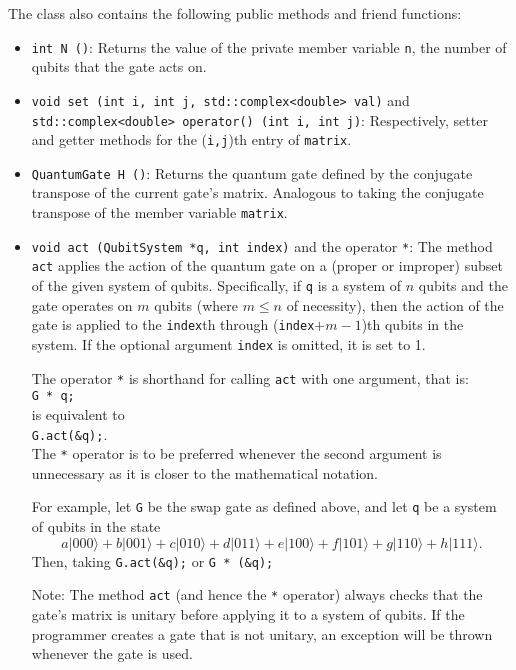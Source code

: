 \documentclass{article}
\begin{document}
The class also contains the following public methods and friend functions: 
\begin{itemize} 
\item \verb~int N ()~: Returns the value of the private member variable \verb~n~, the number of qubits that the gate acts on.

\item \verb~void set (int i, int j, std::complex<double> val)~ and \\
\verb~std::complex<double> operator() (int i, int j)~: Respectively, setter and getter methods for the (\verb~i,j~)th entry of \verb~matrix~. 

\item \verb~QuantumGate H ()~: Returns the quantum gate defined by the conjugate transpose of the current gate's matrix. Analogous to taking the conjugate transpose of the member variable \verb~matrix~. 

\item \verb~void act (QubitSystem *q, int index)~ and the operator \verb~*~: The method \verb~act~ applies the action of the quantum gate on a (proper or improper) subset of the given system of qubits. Specifically, if \verb~q~ is a system of $n$ qubits and the gate operates on $m$ qubits (where $m \le n$ of necessity), then the action of the gate is applied to the \verb~index~th through (\verb~index~$ + m - 1$)th qubits in the system. If the optional argument \verb~index~ is omitted, it is set to 1.

The operator \verb~*~ is shorthand for calling \verb~act~ with one argument, that is: \\ 
\hspace*{1em} \verb~G * q;~ \\ 
is equivalent to \\
\hspace*{1em} \verb~G.act(&q);~. \\ 
The \verb~*~ operator is to be preferred whenever the second argument is unnecessary as it is closer to the mathematical notation. 

For example, let \verb~G~ be the swap gate as defined above, and let \verb~q~ be a system of qubits in the state 
\[ a|000\rangle + b|001\rangle + c|010\rangle + d|011\rangle + e|100\rangle + f|101\rangle + g|110\rangle + h|111\rangle .\] 
Then, taking 
\hspace*{1em} \verb~G.act(&q);~
or
\hspace*{1em} \verb~G * (&q);~

Note: The method \verb~act~ (and hence the \verb~*~ operator) always checks that the gate's matrix is unitary before applying it to a system of qubits. If the programmer creates a gate that is not unitary, an exception will be thrown whenever the gate is used. 


\end{itemize}
\end{document}
